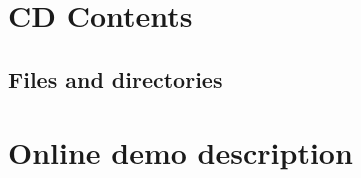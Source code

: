 \appendix
\chapter{CD Contents}

\section{Files and directories}








\page
\chapter{Online demo description}
